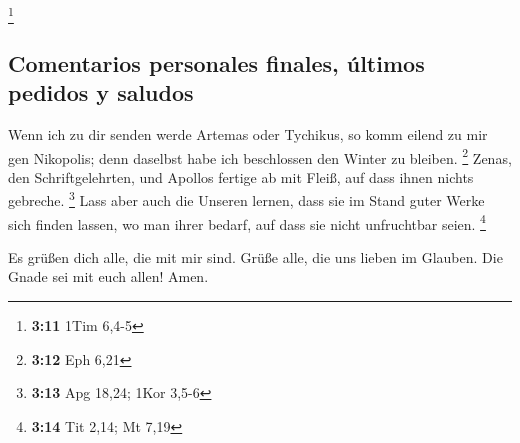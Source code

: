 \footnote{\textbf{3:11} 1Tim 6,4-5}

\hypertarget{comentarios-personales-finales-uxfaltimos-pedidos-y-saludos}{%
\subsection{Comentarios personales finales, últimos pedidos y
saludos}\label{comentarios-personales-finales-uxfaltimos-pedidos-y-saludos}}

 Wenn ich zu dir senden werde Artemas oder Tychikus, so
komm eilend zu mir gen Nikopolis; denn daselbst habe ich beschlossen den
Winter zu bleiben. \footnote{\textbf{3:12} Eph 6,21} 
Zenas, den Schriftgelehrten, und Apollos fertige ab mit Fleiß, auf dass
ihnen nichts gebreche. \footnote{\textbf{3:13} Apg 18,24; 1Kor 3,5-6}
 Lass aber auch die Unseren lernen, dass sie im Stand
guter Werke sich finden lassen, wo man ihrer bedarf, auf dass sie nicht
unfruchtbar seien. \footnote{\textbf{3:14} Tit 2,14; Mt 7,19}

 Es grüßen dich alle, die mit mir sind. Grüße alle, die
uns lieben im Glauben. Die Gnade sei mit euch allen! Amen.
